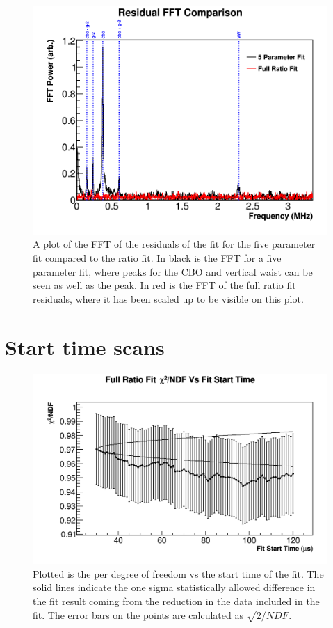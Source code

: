 \begin{figure}[]
	\centering
	\includegraphics[width=\textwidth]{FFTComparison_RatioCBO}
    \caption[FFTComparison_RatioCBO]{A plot of the FFT of the residuals of the fit for the five parameter fit compared to the ratio fit. In black is the FFT for a five parameter fit, where peaks for the CBO and vertical waist can be seen as well as the \gmtwo peak. In red is the FFT of the full ratio fit residuals, where it has been scaled up to be visible on this plot.}
    \label{fig:FFTComparison_RatioCBO}
\end{figure}


\section{Start time scans}

\begin{figure}[H]
	\centering
	\includegraphics[width=\textwidth]{RatioCBO_Chi2NDF_Vs_FS_canv}
    \caption[RatioCBO_Chi2NDF_Vs_FS_canv]{Plotted is the \chisq per degree of freedom vs the start time of the fit. The solid lines indicate the one sigma statistically allowed difference in the fit result coming from the reduction in the data included in the fit. The error bars on the points are calculated as $\sqrt{2/NDF}$.}
    \label{fig:RatioCBO_Chi2NDF_Vs_FS_canv}
\end{figure}


